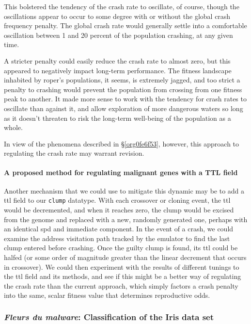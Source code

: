\documentclass[12pt,glossary]{dalthesis}
\begin{document}
This bolstered the tendency of the crash rate to oscillate, of course, though
the oscillations appear to occur to some degree with or without the global
crash frequency penalty. The global crash rate would generally settle into
a comfortable oscillation between 1 and 20 percent of the population crashing,
at any given time. 

A stricter penalty could easily reduce the crash rate to almost zero, but
this appeared to negatively impact long-term performance. The fitness landscape
inhabited by \gls{roper}'s populations, it seems, is extremely jagged, and
too strict a penalty to crashing would prevent the population from crossing 
from one fitness peak to another. It made more sense to work with the tendency
for crash rates to oscillate than against it, and allow exploration of more
dangerous waters so long as it doesn't threaten to risk the long-term well-being
of the population as a whole. 

In view of the phenomena described in \S \ref{org0fe6f53}, however, this approach to regulating the crash rate may warrant revision. 

\paragraph{A proposed method for regulating malignant genes with a TTL field}
\label{sec:org671f899}
\label{orge0fc0d6}

Another mechanism that we could use to mitigate this dynamic may be to add
a \gls{ttl} field to our \texttt{clump} datatype. With each crossover or cloning event, 
the \gls{ttl} would be decremented, and when it reaches zero, the clump would be
excised from the genome and replaced with a new, randomly generated one, perhaps
with an identical \gls{spd} and immediate component. In the event of a crash, we
could examine the address visitation path tracked by the emulator to find the 
last clump entered before crashing. Once the guilty clump is found, its \gls{ttl}
could be halfed (or some order of magnitude greater than the linear decrement
that occurs in crossover). We could then experiment with the results of different
tunings to the \gls{ttl} field and its methods, and see if this might be a better
way of regulating the crash rate than the current approach, which simply factors
a crash penalty into the same, scalar fitness value that determines reproductive
odds. 


\subsubsection{\emph{Fleurs du malware}: Classification of the Iris data set}
\label{sec:orgc572103}
\label{org9bc2696}
\end{document}
